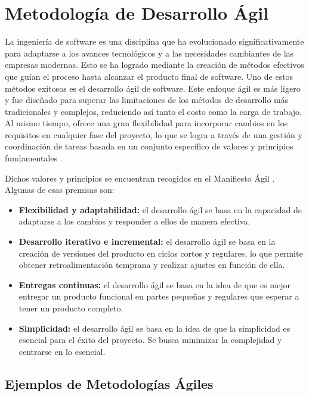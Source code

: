 \section{Metodología de Desarrollo Ágil}

La ingeniería de software es una disciplina que ha evolucionado significativamente para adaptarse a los avances tecnológicos y a las necesidades cambiantes de las empresas modernas. Esto se ha logrado mediante la creación de métodos efectivos que guían el proceso hasta alcanzar el producto final de software. Uno de estos métodos exitosos es el desarrollo ágil de software. Este enfoque ágil es más ligero y fue diseñado para superar las limitaciones de los métodos de desarrollo más tradicionales y complejos, reduciendo así tanto el costo como la carga de trabajo. Al mismo tiempo, ofrece una gran flexibilidad para incorporar cambios en los requisitos en cualquier fase del proyecto, lo que se logra a través de una gestión y coordinación de tareas basada en un conjunto específico de valores y principios fundamentales \cite{AlSaqqa2020AgileSD}.\newline

Dichos valores y principios se encuentran recogidos en el Manifiesto Ágil \cite{beck2001agile}. Algunas de esas premisas son:

\begin{itemize}
    \item \textbf{Flexibilidad y adaptabilidad:} el desarrollo ágil se basa en la capacidad de adaptarse a los cambios y responder a ellos de manera efectiva.
    \item \textbf{Desarrollo iterativo e incremental:} el desarrollo ágil se basa en la creación de versiones del producto en ciclos cortos y regulares, lo que permite obtener retroalimentación temprana y realizar ajustes en función de ella.
    \item \textbf{Entregas continuas:} el desarrollo ágil se basa en la idea de que es mejor entregar un producto funcional en partes pequeñas y regulares que esperar a tener un producto completo.
    \item \textbf{Simplicidad:} el desarrollo ágil se basa en la idea de que la simplicidad es esencial para el éxito del proyecto. Se busca minimizar la complejidad y centrarse en lo esencial.
\end{itemize}

\subsection{Ejemplos de Metodologías Ágiles}

